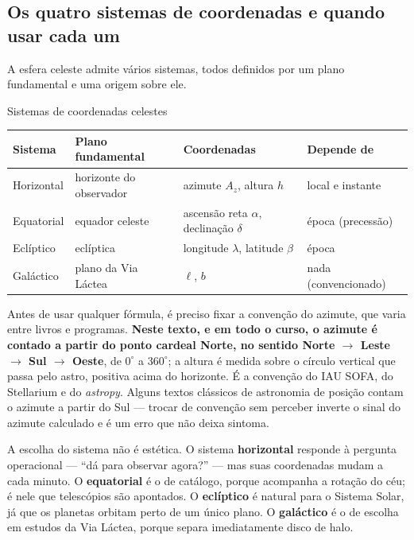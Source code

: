 \documentclass[11pt,a4paper]{article}
\begin{document}
\subsection*{Os quatro sistemas de coordenadas e quando usar cada um}

A esfera celeste admite vários sistemas, todos definidos por um plano fundamental e uma origem sobre ele.

\begin{lessonblock}{Sistemas de coordenadas celestes}
\begin{tabular}{>{\raggedright\arraybackslash}p{}>{\raggedright\arraybackslash}p{}>{\raggedright\arraybackslash}p{}>{\raggedright\arraybackslash}p{}}
\toprule
Sistema & Plano fundamental & Coordenadas & Depende de \\
\midrule
Horizontal & horizonte do observador & azimute $A_z$, altura $h$ & local e instante \\
Equatorial & equador celeste & ascensão reta $\alpha$, declinação $\delta$ & época (precessão) \\
Eclíptico & eclíptica & longitude $\lambda$, latitude $\beta$ & época \\
Galáctico & plano da Via Láctea & $\ell$, $b$ & nada (convencionado) \\
\bottomrule
\end{tabular}
\end{lessonblock}

Antes de usar qualquer fórmula, é preciso fixar a convenção do azimute, que varia entre livros e programas. \textbf{Neste texto, e em todo o curso, o azimute é contado a partir do ponto cardeal Norte, no sentido Norte $\to$ Leste $\to$ Sul $\to$ Oeste}, de $0^\circ$ a $360^\circ$; a altura é medida sobre o círculo vertical que passa pelo astro, positiva acima do horizonte. É a convenção do IAU SOFA, do Stellarium e do \textit{astropy}. Alguns textos clássicos de astronomia de posição contam o azimute a partir do Sul --- trocar de convenção sem perceber inverte o sinal do azimute calculado e é um erro que não deixa sintoma.

A escolha do sistema não é estética. O sistema \textbf{horizontal} responde à pergunta operacional --- ``dá para observar agora?'' --- mas suas coordenadas mudam a cada minuto. O \textbf{equatorial} é o de catálogo, porque acompanha a rotação do céu; é nele que telescópios são apontados. O \textbf{eclíptico} é natural para o Sistema Solar, já que os planetas orbitam perto de um único plano. O \textbf{galáctico} é o de escolha em estudos da Via Láctea, porque separa imediatamente disco de halo.
\end{document}
